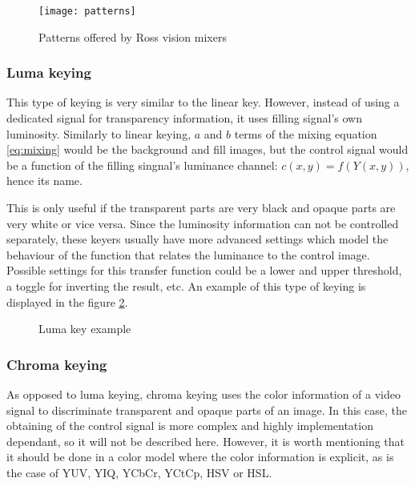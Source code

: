 \documentclass[../main.tex]{subfiles}
\begin{document}
\begin{figure}[htbp]
    \centering
    \texttt{[image: patterns]}
    \caption{Patterns offered by Ross vision mixers}
    \label{fig:patterns}
\end{figure}

\subsubsection{Luma keying}
This type of keying is very similar to the linear key. However, instead of using a dedicated signal for transparency information, it uses filling signal's own luminosity. Similarly to linear keying, $a$ and $b$ terms of the mixing equation \eqref{eq:mixing} would be the background and fill images, but the control signal would be a function of the filling singnal's luminance channel: $c(x, y) = f(Y(x, y))$, hence its name.\newline

This is only useful if the transparent parts are very black and opaque parts are very white or vice versa. Since the luminosity information can not be controlled separately, these keyers usually have more advanced settings which model the behaviour of the function that relates the luminance to the control image. Possible settings for this transfer function could be a lower and upper threshold, a toggle for inverting the result, etc. An example of this type of keying is displayed in the figure \ref{fig:luma_key_example}.

\begin{figure}[htbp]
    \centering

    \caption{Luma key example}
    \label{fig:luma_key_example}
\end{figure}

\subsubsection{Chroma keying}
As opposed to luma keying, chroma keying uses the color information of a video signal to discriminate transparent and opaque parts of an image. In this case, the obtaining of the control signal is more complex and highly implementation dependant, so it will not be described here. However, it is worth mentioning that it should be done in a color model where the color information is explicit, as is the case of YUV, YIQ, YCbCr, YCtCp, HSV or HSL.\newline
\end{document}
